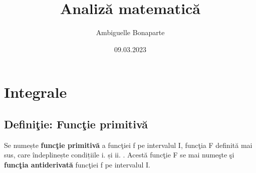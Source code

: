 \documentclass{article}
\title{\Huge Analiz\u a matematic\u a}
\author{Ambiguelle Bonaparte}
\date{09.03.2023}
\begin{document}
\maketitle

\pagestyle{fancy}
\fancyhead{}
 {
}
\thispagestyle{firstpage}

\newpage
\tableofcontents
\newpage
\section{Integrale}
\subsection{Defini\c tie: Func\c tie primitiv\u a}
Se numește {\bf func\c tie  primitiv\u a} a func\c tiei f pe intervalul I, func\c tia F definit\u a mai sus, care \^ indeplinește condițiile i. și ii. . Acestă func\c tie F se mai nume\c ste \c si {\bf func\c tia antiderivat\u a} func\c tiei f pe intervalul I. \cite{text1}
\end{document}
